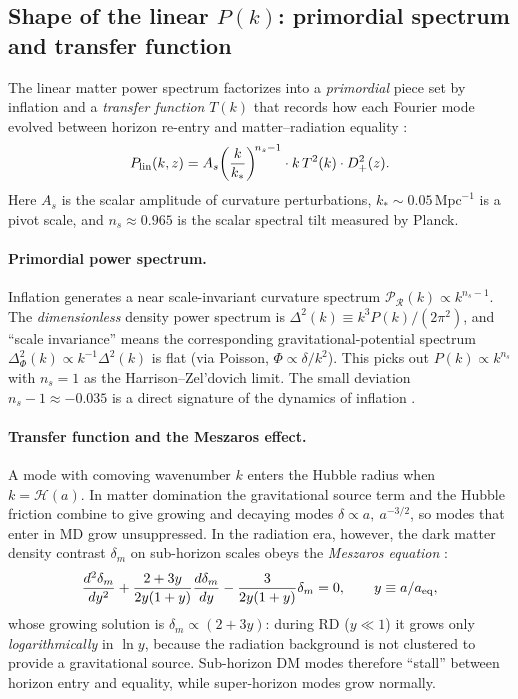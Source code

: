 \documentclass[12pt]{article}
\newcommand{\Dp}{D_+}
\newcommand{\calH}{\mathcal{H}}
\begin{document}
\subsection{Shape of the linear $P(k)$: primordial spectrum and transfer function}
\label{sec:pk_shape}

The linear matter power spectrum factorizes into a \emph{primordial}
piece set by inflation and a \emph{transfer function} $T(k)$ that
records how each Fourier mode evolved between horizon re-entry and
matter--radiation equality
\citep[see e.g.][\S3.1--3.2]{Tong2019}:
%
\begin{equation}
  P_{\rm lin}(k, z)
    = A_s\!\left(\frac{k}{k_*}\right)^{\!n_s-1}
      \cdot k\, T^{2}(k)\cdot\Dp^{2}(z).
  \label{eq:pk_shape}
\end{equation}
%
Here $A_s$ is the scalar amplitude of curvature perturbations,
$k_*\sim 0.05\,\mathrm{Mpc}^{-1}$ is a pivot scale, and $n_s\approx
0.965$ is the scalar spectral tilt measured by Planck.

\paragraph{Primordial power spectrum.}
Inflation generates a near scale-invariant curvature spectrum
$\mathcal{P}_\mathcal{R}(k)\propto k^{n_s-1}$.  The
\emph{dimensionless} density power spectrum is
$\Delta^2(k)\equiv k^3 P(k)/(2\pi^2)$, and ``scale invariance'' means
the corresponding gravitational-potential spectrum
$\Delta^2_\Phi(k)\propto k^{-1}\Delta^2(k)$ is flat (via Poisson,
$\Phi\propto\delta/k^2$).  This picks out $P(k)\propto k^{n_s}$ with
$n_s=1$ as the Harrison--Zel'dovich limit.  The small deviation
$n_s-1\approx -0.035$ is a direct signature of the dynamics of
inflation \citep[see][\S3.2.1]{Tong2019}.

\paragraph{Transfer function and the Meszaros effect.}
A mode with comoving wavenumber $k$ enters the Hubble radius when
$k=\calH(a)$.  In matter domination the gravitational source term
and the Hubble friction combine to give growing and decaying modes
$\delta\propto a,\ a^{-3/2}$, so modes that enter in MD grow
unsuppressed.  In the radiation era, however, the dark matter
density contrast $\delta_m$ on sub-horizon scales obeys the
\emph{Meszaros equation} \citep[][\S5.1]{Baumann2022}:
%
\begin{equation}
  \frac{d^2\delta_m}{dy^2}
    + \frac{2+3y}{2y(1+y)}\frac{d\delta_m}{dy}
    - \frac{3}{2y(1+y)}\delta_m = 0,
  \qquad y\equiv a/a_{\rm eq},
  \label{eq:meszaros}
\end{equation}
%
whose growing solution is $\delta_m\propto(2+3y)$: during RD
($y\ll1$) it grows only \emph{logarithmically} in $\ln y$, because
the radiation background is not clustered to provide a gravitational
source.  Sub-horizon DM modes therefore ``stall'' between horizon
entry and equality, while super-horizon modes grow normally.
\end{document}
